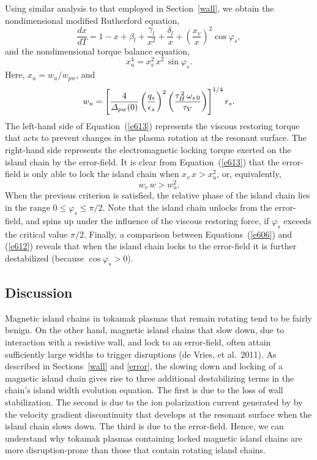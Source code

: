 \documentclass[notitlepage,12pt]{article}
\begin{document}
Using similar analysis to that employed in Section~\ref{wall}, we obtain the nondimensional modified Rutherford equation,
\begin{equation}\label{e612}
\frac{dx}{dT} = 1-x+\beta_l + \frac{\gamma_l}{x^2} + \frac{\delta_l}{x} + \left(\frac{x_v}{x}\right)^2\cos\varphi_s,
\end{equation}
and the nondimensional torque balance equation,
\begin{equation}\label{e613}
x_u^{4} = x_v^{2}\,x^2\,\sin\varphi_s.
\end{equation}
Here, $x_u = w_u/w_{pw}$, and
\begin{equation}
w_u = \left[\frac{4}{{\mit\Delta}_{pw}(0)}\left(\frac{q_s}{\epsilon_s}\right)^2\left(\frac{\tau_H^{\,2}\,\omega_{s\,0}}{\tau_V}\right)\right]^{1/4}r_s.
\end{equation}
The left-hand side of Equation~(\ref{e613}) represents the viscous restoring torque that acts to prevent changes in the plasma rotation at the resonant surface. The right-hand side represents the electromagnetic locking torque exerted on the island chain by
the error-field. It is clear from Equation~(\ref{e613}) that the error-field is only able to lock the island chain when
$x_v\,x> x_u^2$, or, equivalently, 
\begin{equation}
w_v\,w > w_u^2.
\end{equation}
When the previous criterion is satisfied, the relative phase of the island chain lies in the range $0\leq \varphi_s\leq \pi/2$. Note that the island
chain unlocks from the error-field, and spins up under the influence of the viscous restoring force, if $\varphi_s$
exceeds the critical value $\pi/2$.
Finally, a comparison between Equations~(\ref{e606}) and (\ref{e612}) reveals that when the island chain locks to
the error-field it is further destabilized (because $\cos\varphi_s>0$). 

\subsection{Discussion}
Magnetic island chains in tokamak plasmas that remain rotating tend to be fairly benign.
On the other hand, magnetic island chains that slow down, due to interaction with a resistive wall, and lock to an error-field, often
attain sufficiently large widths to trigger disruptions (de Vries, et al.\ 2011). As described in Sections~\ref{wall} and \ref{error}, 
the slowing down and locking of a magnetic island chain gives rise to three additional destabilizing terms in the chain's
island width evolution equation. The first is due to the loss of wall stabilization. The second is due to the ion polarization
current generated by by the velocity gradient discontinuity that develops at the resonant surface when the island chain
slows down. The third is due to the error-field. Hence, we can understand why tokamak plasmas containing
locked magnetic island chains are more disruption-prone than those that contain rotating island chains. 
\end{document}
